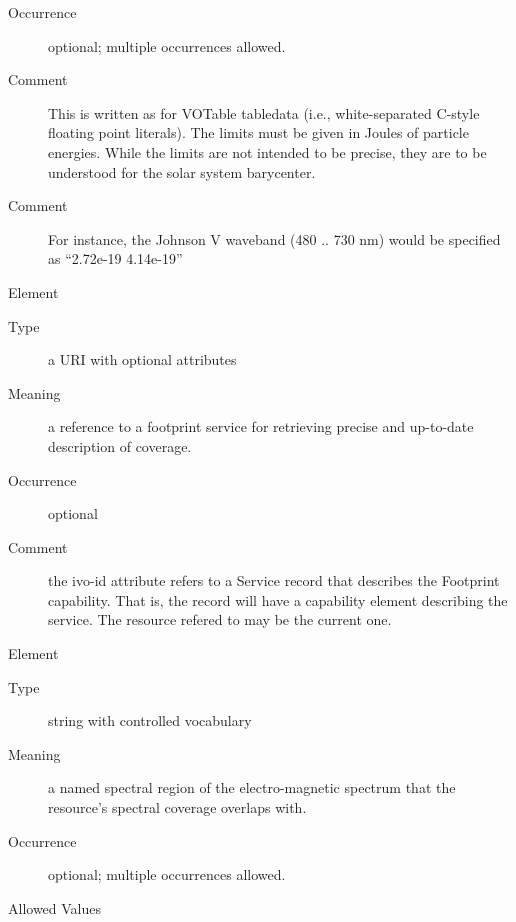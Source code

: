 \documentclass[11pt,a4paper]{ivoa}
\begin{document}
\begin{generated}
\begin{bigdescription}
\begin{description}
\item[Occurrence] optional; multiple occurrences allowed.

\item[Comment] 
                  This is written as for VOTable tabledata (i.e., 
                  white-separated C-style floating point literals).
                  The limits must be given in Joules of particle
                  energies.  While the limits are not intended 
                  to be precise, they are to be understood for the
                  solar system barycenter.
               
\item[Comment] 
                  For instance, the Johnson V waveband (480 .. 730 nm)
                  would be specified as “2.72e-19 4.14e-19”
               

\end{description}
\item[Element \xmlel{footprint}]
\begin{description}
\item[Type] a URI with optional attributes
\item[Meaning] 
                  a reference to a footprint service for retrieving 
                  precise and up-to-date description of coverage.  
               
\item[Occurrence] optional
\item[Comment] 
                  the ivo-id attribute refers to a Service record
                  that describes the Footprint capability.  That is,
                  the record will have a capability element describing
                  the service.  The resource refered to may be the 
                  current one.  
               

\end{description}
\item[Element \xmlel{waveband}]
\begin{description}
\item[Type] string with controlled vocabulary
\item[Meaning] 
                  a named spectral region of the electro-magnetic spectrum 
                  that the resource's spectral coverage overlaps with.
               
\item[Occurrence] optional; multiple occurrences allowed.

\item[Allowed Values]\hfil
{}
\end{description}
\end{bigdescription}
\end{generated}
\end{document}
